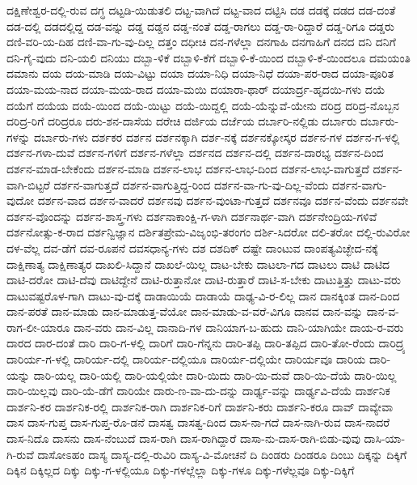ದಕ್ಷಿಣೇಶ್ವರ-ದಲ್ಲಿ-ರುವ
ದಗ್ಧ
ದಟ್ಟಡಿ-ಯಿಡುತಲಿ
ದಟ್ಟ-ವಾಗಿದೆ
ದಟ್ಟ-ವಾದ
ದಟ್ಟಿಸಿ
ದಡ
ದಡಕ್ಕೆ
ದಡದ
ದಡ-ದಂತೆ
ದಡ-ದಲ್ಲಿ
ದಡದಲ್ಲಿದ್ದ
ದಡ-ವನ್ನು
ದಡ್ಡ
ದಡ್ಡನ
ದಡ್ಡ-ನಂತೆ
ದಡ್ಡ-ರಾಗಲು
ದಡ್ಡ-ರಾ-ರಿದ್ದಾರೆ
ದಡ್ಡ-ರಿಗೂ
ದಡ್ಡರು
ದಣಿ-ವರಿ-ಯ-ದಿಹ
ದಣಿ-ವಾ-ಗು-ವು-ದಿಲ್ಲ
ದತ್ತಂ
ದಧೀಚಿ
ದನ-ಗಳೆಲ್ಲಾ
ದನಗಾಹಿ
ದನಗಾಹಿಗೆ
ದನದ
ದನಿ
ದನಿಗೆ
ದನಿ-ಗೈ-ವುದು
ದನಿ-ಯಲಿ
ದನಿಯು
ದಬ್ಬಾ-ಳಿಕೆ
ದಬ್ಬಾಳಿ-ಕೆಗೆ
ದಬ್ಬಾಳಿ-ಕೆ-ಯಿಂದ
ದಬ್ಬಾಳಿ-ಕೆ-ಯಿಂದಲೂ
ದಮಯಂತಿ
ದಮಾನು
ದಯ
ದಯ-ಮಾಡಿ
ದಯ-ವಿಟ್ಟು
ದಯಾ
ದಯಾ-ನಿಧಿ
ದಯಾ-ನಿಧೆ
ದಯಾ-ಪರ-ರಾದ
ದಯಾ-ಪೂರಿತ
ದಯಾ-ಮಯ-ನಾದ
ದಯಾ-ಮಯ-ರಾದ
ದಯಾ-ಮಯಿ
ದಯಾರಾ-ಥಾರ್
ದಯಾರ್ದ್ರ-ಹೃದಯಿ-ಗಳು
ದಯೆ
ದಯೆಗೆ
ದಯೆಯ
ದಯೆ-ಯಿಂದ
ದಯೆ-ಯಿಟ್ಟು
ದಯೆ-ಯಿದ್ದಲ್ಲಿ
ದಯೆ-ಯೆನ್ನುವೆ-ಯೇನು
ದರಿದ್ರ
ದರಿದ್ರ-ನೊಬ್ಬನ
ದರಿದ್ರ-ರಿಗೆ
ದರಿದ್ರರೂ
ದರು-ಶನ-ದಾಸೆಯ
ದರೇಚಿ
ದರ್ಜಿಯ
ದರ್ಜೆಯ
ದರ್ಬಾರಿ-ನಲ್ಲಿಡು
ದರ್ಬಾರು
ದರ್ಬಾರು-ಗಳನ್ನು
ದರ್ಬಾರು-ಗಳು
ದರ್ಶಕರ
ದರ್ಶನ
ದರ್ಶನಕ್ಕಾಗಿ
ದರ್ಶ-ನಕ್ಕೆ
ದರ್ಶನಕ್ಕೋಸ್ಕರ
ದರ್ಶನ-ಗಳ
ದರ್ಶನ-ಗ-ಳಲ್ಲಿ
ದರ್ಶನ-ಗಳಾ-ದುವೆ
ದರ್ಶನ-ಗಳಿಗೆ
ದರ್ಶನ-ಗಳೆಲ್ಲಾ
ದರ್ಶನದ
ದರ್ಶನ-ದಲ್ಲಿ
ದರ್ಶನ-ದಾರಭ್ಯ
ದರ್ಶನ-ದಿಂದ
ದರ್ಶನ-ಮಾಡ-ಬೇಕೆಂದು
ದರ್ಶನ-ಮಾಡಿ
ದರ್ಶನ-ಲಾಭ
ದರ್ಶನ-ಲಾಭ-ದಿಂದ
ದರ್ಶನ-ಲಾಭ-ವಾಗುತ್ತದೆ
ದರ್ಶನ-ವಾಗಿ-ಬಿಟ್ಟರೆ
ದರ್ಶನ-ವಾಗುತ್ತದೆ
ದರ್ಶನ-ವಾಗುತ್ತಿದ್ದ-ರಿಂದ
ದರ್ಶನ-ವಾ-ಗು-ವು-ದಿಲ್ಲ-ವೆಂದು
ದರ್ಶನ-ವಾಗು-ವುದೋ
ದರ್ಶನ-ವಾದ
ದರ್ಶನ-ವಾದರೆ
ದರ್ಶನವು
ದರ್ಶನ-ವುಂಟಾ-ಗುತ್ತದೆ
ದರ್ಶನವೂ
ದರ್ಶನ-ವೆಂದು
ದರ್ಶನವೇ
ದರ್ಶನ-ವೊಂದನ್ನು
ದರ್ಶನ-ಶಾಸ್ತ್ರ-ಗಳು
ದರ್ಶನಾಕಾಂಕ್ಷಿ-ಗ-ಳಾಗಿ
ದರ್ಶನಾರ್ಥ-ವಾಗಿ
ದರ್ಶನೇಂದ್ರಿಯ-ಗಳಿವೆ
ದರ್ಶನೋತ್ಸು-ಕ-ರಾದ
ದರ್ಶನ್ವಿಜ್ಞಾನ
ದರ್ಶಿತಪ್ರೇಮ-ವಿಜೃಂಭಿ-ತರಂಗಂ
ದರ್ಶಿ-ಸಿದರೋ
ದಲಿ-ತರೋ
ದಲ್ಲಿ-ರುವಿರೋ
ದಳ-ವೆಲ್ಲ
ದವ-ಡೆಗೆ
ದವ-ರೂಪನೆ
ದವಸಧಾನ್ಯ-ಗಳು
ದಶ
ದಶದಿಕ್
ದಷ್ಟೇ
ದಾಂಟುವ
ದಾಂಪತ್ಯವಿಚ್ಛೇದ-ನಕ್ಕೆ
ದಾಕ್ಷಿಣಾತ್ಯ
ದಾಕ್ಷಿಣಾತ್ಯರ
ದಾಖಲಿ-ಸಿದ್ದಾನೆ
ದಾಖಲೆ-ಯಿಲ್ಲ
ದಾಟ-ಬೇಕು
ದಾಟಲಾ-ಗದ
ದಾಟಲು
ದಾಟಿ
ದಾಟಿದ
ದಾಟಿ-ದರೋ
ದಾಟಿ-ದೆವು
ದಾಟಿದ್ದೇನೆ
ದಾಟಿ-ರುತ್ತಾನೋ
ದಾಟಿ-ರುತ್ತಾರೆ
ದಾಟಿ-ಸ-ಬೇಕು
ದಾಟುತ್ತಿತ್ತು
ದಾಟು-ವರು
ದಾಟುವಷ್ಟರೊಳ-ಗಾಗಿ
ದಾಟು-ವು-ದಕ್ಕೆ
ದಾಡಾಯಿಯೆ
ದಾಡಾಯೆ
ದಾಢ್ಯ-ವಿ-ರ-ಲಿಲ್ಲ
ದಾನ
ದಾನಕ್ಕಿಂತ
ದಾನ-ದಿಂದ
ದಾನ-ಪರತೆ
ದಾನ-ಮಾಡು
ದಾನ-ಮಾಡುತ್ತ-ವೆಯೋ
ದಾನ-ಮಾಡು-ವ-ವರೆ-ವಿಗೂ
ದಾನವ
ದಾನ-ವನ್ನು
ದಾನ-ವ-ರಾಗ-ಲೀ-ಯಾರೂ
ದಾನ-ವರು
ದಾನ-ವಿಲ್ಲ
ದಾನಾದಿ-ಗಳ
ದಾನಿಯಾಗ-ಬ-ಹುದು
ದಾನಿ-ಯಾಗಿಯೇ
ದಾಯ-ರ-ವರು
ದಾರದ
ದಾರ-ದಂತೆ
ದಾರಿ
ದಾರಿ-ಗ-ಳಲ್ಲಿ
ದಾರಿಗೆ
ದಾರಿ-ಗೆನ್ನನು
ದಾರಿ-ತಪ್ಪಿ
ದಾರಿ-ತಪ್ಪಿದ
ದಾರಿ-ತೋ-ರೆಂದು
ದಾರಿದ್ರ್ಯ
ದಾರಿರ್ಯ-ಗ-ಳಲ್ಲಿ
ದಾರಿರ್ಯ-ದಲ್ಲಿ
ದಾರಿರ್ಯ-ದಲ್ಲಿಯೂ
ದಾರಿರ್ಯ-ದಲ್ಲಿಯೇ
ದಾರಿರ್ಯವೂ
ದಾರಿಯ
ದಾರಿ-ಯನ್ನು
ದಾರಿ-ಯಲ್ಲ
ದಾರಿ-ಯಲ್ಲಿ
ದಾರಿ-ಯಲ್ಲಿಯೇ
ದಾರಿ-ಯಿದು
ದಾರಿ-ಯಿ-ದುವೆ
ದಾರಿ-ಯಿ-ದೆಯೆ
ದಾರಿ-ಯಿಲ್ಲ
ದಾರಿ-ಯಿಲ್ಲವು
ದಾರಿ-ಯೆ-ಡೆಗೆ
ದಾರಿಯೇ
ದಾರು-ಣ-ವಾ-ದು-ದನ್ನು
ದಾರ್ಢ್ಯ-ವನ್ನು
ದಾರ್ಢ್ಯವಿ-ದೆಯೆ
ದಾರ್ಶನಿಕ
ದಾರ್ಶನಿ-ಕರ
ದಾರ್ಶನಿಕ-ರಲ್ಲಿ
ದಾರ್ಶನಿಕ-ರಾಗಿ
ದಾರ್ಶನಿಕ-ರಿಗೆ
ದಾರ್ಶನಿ-ಕರು
ದಾರ್ಶನಿ-ಕರೂ
ದಾವ್
ದಾವ್ಯೇವಾ
ದಾಸ
ದಾಸ-ಗುಪ್ತ
ದಾಸ-ಗುಪ್ತ-ರೊ-ಡನೆ
ದಾಸತ್ವ
ದಾಸತ್ವ-ದಿಂದ
ದಾಸ-ನಾ-ಗದೆ
ದಾಸ-ನಾಗಿ-ರುವ
ದಾಸ-ನಾದರೆ
ದಾಸ-ನಿದೊ
ದಾಸನು
ದಾಸ-ನೆಂಬುದೆ
ದಾಸ-ರಾಗಿ
ದಾಸ-ರಾಗಿದ್ದಾರೆ
ದಾಸಾ-ನು-ದಾಸ-ರಾಗಿ-ಬಿಡು-ವುವು
ದಾಸಿ-ಯಾ-ಗಿ-ರುವೆ
ದಾಸೋಽಹಂ
ದಾಸ್ಯ
ದಾಸ್ಯ-ದಲ್ಲಿ-ರುವಿರಿ
ದಾಸ್ಯ-ವಿ-ಮೋಚನೆ
ದಿ
ದಿಂಡರು
ದಿಂಡರೂ
ದಿಂಬು
ದಿಕ್ಕನ್ನು
ದಿಕ್ಕಿಗೆ
ದಿಕ್ಕಿನ
ದಿಕ್ಕಿಲ್ಲದ
ದಿಕ್ಕು
ದಿಕ್ಕು-ಗ-ಳಲ್ಲಿಯೂ
ದಿಕ್ಕು-ಗಳಲ್ಲೆಲ್ಲಾ
ದಿಕ್ಕು-ಗಳೂ
ದಿಕ್ಕು-ಗಳೆಲ್ಲವೂ
ದಿಕ್ಕು-ದಿಕ್ಕಿಗೆ
